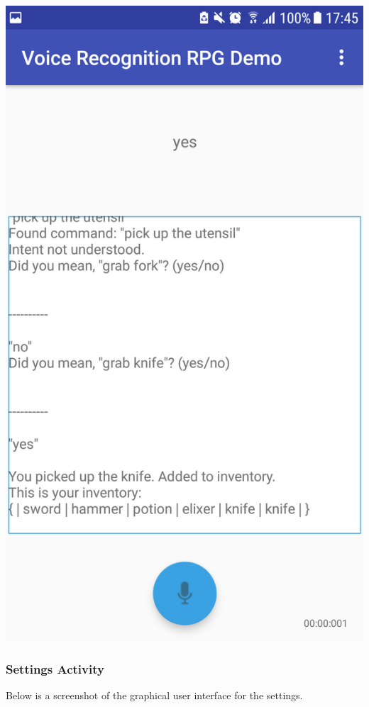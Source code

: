 \documentclass[11pt]{article}
\begin{document}
\begin{center}
\includegraphics[scale=0.18]{utensil-2.png}
\end{center}

\newpage
\subsubsection{Settings Activity}
\label{appendix:settings}
Below is a screenshot of the graphical user interface for the settings.
\end{document}
